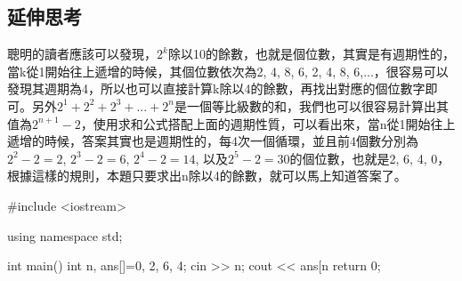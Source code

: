 \subsection{延伸思考}
聰明的讀者應該可以發現，$2^k$除以10的餘數，也就是個位數，其實是有週期性的，當k從1開始往上遞增的時候，其個位數依次為2, 4, 8, 6, 2, 4, 8, 6,...，很容易可以發現其週期為4，所以也可以直接計算k除以4的餘數，再找出對應的個位數字即可。另外$2^{1}+2^{2}+2^{3}+...+2^{n}$是一個等比級數的和，我們也可以很容易計算出其值為$2^{n+1}-2$，使用求和公式搭配上面的週期性質，可以看出來，當n從1開始往上遞增的時候，答案其實也是週期性的，每4次一個循環，並且前4個數分別為$2^2-2=2$, $2^3-2=6$, $2^4-2=14$, 以及$2^5-2=30$的個位數，也就是2, 6, 4, 0，根據這樣的規則，本題只要求出n除以4的餘數，就可以馬上知道答案了。
\begin{cppcode}
	#include <iostream>
	
	using namespace std;
	
	int main()
	{
		int n, ans[]={0, 2, 6, 4};
		cin >> n;
		cout << ans[n%
		return 0;
	}
\end{cppcode}
